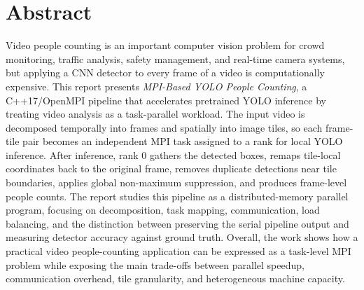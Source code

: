 \chapter*{Abstract}

Video people counting is an important computer vision problem for crowd monitoring, traffic analysis, safety management, and real-time camera systems, but applying a CNN detector to every frame of a video is computationally expensive. This report presents \textit{MPI-Based YOLO People Counting}, a C++17/OpenMPI pipeline that accelerates pretrained YOLO inference by treating video analysis as a task-parallel workload. The input video is decomposed temporally into frames and spatially into image tiles, so each frame-tile pair becomes an independent MPI task assigned to a rank for local YOLO inference. After inference, rank 0 gathers the detected boxes, remaps tile-local coordinates back to the original frame, removes duplicate detections near tile boundaries, applies global non-maximum suppression, and produces frame-level people counts. The report studies this pipeline as a distributed-memory parallel program, focusing on decomposition, task mapping, communication, load balancing, and the distinction between preserving the serial pipeline output and measuring detector accuracy against ground truth. Overall, the work shows how a practical video people-counting application can be expressed as a task-level MPI problem while exposing the main trade-offs between parallel speedup, communication overhead, tile granularity, and heterogeneous machine capacity.
    